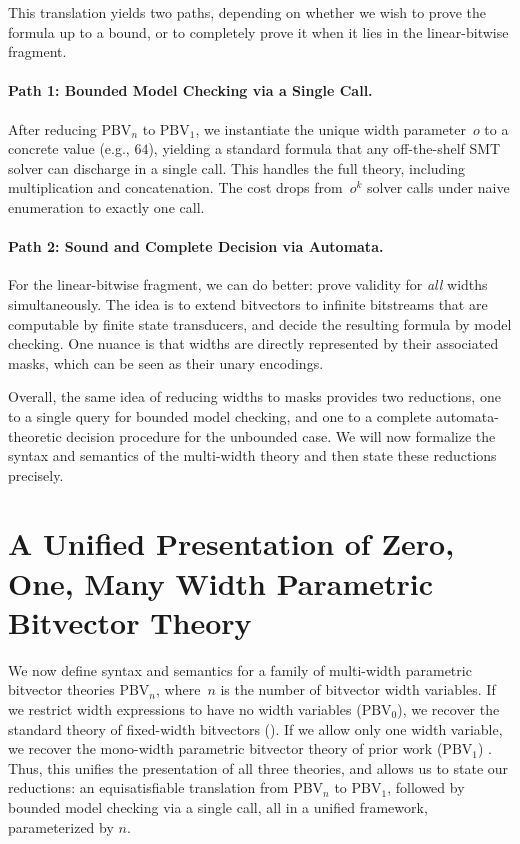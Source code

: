 This translation yields two paths, depending on whether we wish to prove the
formula up to a bound, or to completely prove it when it lies in the
linear-bitwise fragment.

\paragraph{Path 1: Bounded Model Checking via a Single \qfbv{} Call.}
%
After reducing $\text{PBV}_n$ to $\text{PBV}_1$, we instantiate the unique
width parameter~$o$ to a concrete value (e.g., $64$), yielding a standard
\qfbv{} formula that any off-the-shelf SMT solver can discharge in a single
call.  This handles the full theory, including multiplication and
concatenation.  The cost drops from~$o^k$ solver calls under naive enumeration
to exactly one call.

\paragraph{Path 2: Sound and Complete Decision via Automata.}
%
For the linear-bitwise fragment, we can do better: prove validity for \emph{all}
widths simultaneously.  The idea is to extend bitvectors to infinite bitstreams
that are computable by finite state transducers, and decide the resulting
formula by model checking. One nuance is that widths are directly represented by
their associated masks, which can be seen as their unary encodings.

\medskip
Overall, the same idea of reducing widths to masks provides two
reductions, one to a single \qfbv{} query for bounded model checking, and one to
a complete automata-theoretic decision procedure for the unbounded case. We will
now formalize the syntax and semantics of the multi-width theory and then state
these reductions precisely.


\section{A Unified Presentation of Zero, One, Many Width Parametric Bitvector Theory}
\label{sec:mwbv:theory}

We now define syntax and semantics for a family of multi-width
parametric bitvector theories $\text{PBV}_n$, where~$n$ is the number of
bitvector width variables.
%
If we restrict width expressions to have no width variables ($\text{PBV}_0$), we
recover the standard theory of fixed-width bitvectors (\qfbv{}). If we allow
only one width variable, we recover the mono-width parametric bitvector
theory of prior work ($\text{PBV}_1$) \cite{bhat2025certified}.
%
Thus, this unifies the presentation of all three theories, and allows us to
state our reductions: an equisatisfiable translation from $\text{PBV}_n$ to
$\text{PBV}_1$, followed by bounded model checking via a single \qfbv{}
call, all in a unified framework, parameterized by $n$.

